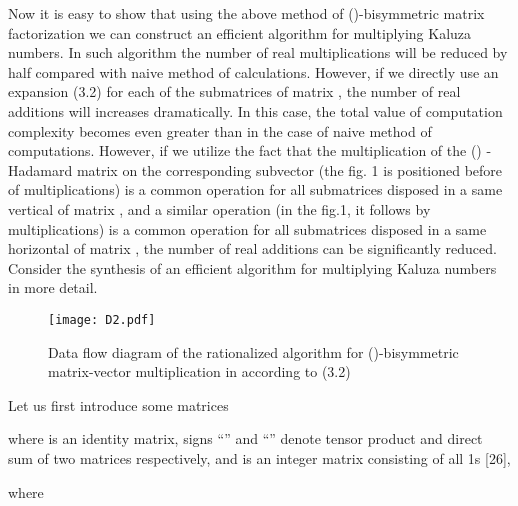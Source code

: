 \documentclass{jtacs}
\numberwithin{equation}{section}
\begin{document}
Now it is easy to show that using the above method of ()-bisymmetric matrix factorization
we can construct an efficient algorithm for multiplying Kaluza numbers. In such algorithm the number of real multiplications will be reduced by half  compared with naive method of calculations. However, if we directly use an expansion (3.2) for
each of the submatrices of matrix , the number of real additions will increases dramatically.
In this case, the total value of computation complexity becomes even greater than in
the case of naive method of computations. However, if we utilize the fact that the
multiplication of the () -Hadamard matrix on the corresponding subvector (the fig. 1 is
positioned before of multiplications) is a common operation for all submatrices disposed in
a same vertical of matrix , and a similar operation (in the fig.1, it follows by multiplications) is a common operation for all submatrices disposed in a same horizontal of matrix , the number of real additions can be significantly reduced. Consider the synthesis of an efficient algorithm for multiplying Kaluza numbers in more detail.

\begin{figure}[ht]
\centering
  \texttt{[image: D2.pdf]}
  \caption{Data flow diagram of the rationalized algorithm for ()-bisymmetric matrix-vector
multiplication in according to (3.2)}
  \label{fig1}
\end{figure}

Let us first introduce some matrices


where  is an identity  matrix, signs ``'' and ``'' denote tensor product and direct sum of two matrices respectively, and   is an integer matrix consisting of all 1s [26],


where

\begin{center}
\begin{adjustbox}{width=0.54\textwidth, margin=0 0 0 10}

\end{adjustbox}
\end{center}

\begin{center}
\begin{adjustbox}{width=0.57\textwidth, margin=0 0 0 0}

\end{adjustbox}
\end{center}

\begin{center}
\begin{adjustbox}{width=0.57\textwidth, margin=0 0 0 0}

\end{adjustbox}
\end{center}
\end{document}
